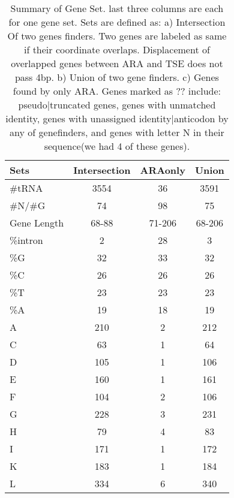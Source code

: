 \documentclass[table,
12pt, %
a4paper, %
oneside, %
headinclude,footinclude, %
BCOR5mm, %
]{scrartcl}
\begin{document}
\begin{table}[htbp]
  \caption{Summary of Gene Set. last three columns are each for one gene set. Sets are defined as: a) Intersection Of two genes finders. Two genes are labeled as same if their coordinate overlaps. Displacement of overlapped genes between ARA and TSE does not pass 4bp. b) Union of two gene finders. c) Genes found by only ARA. Genes marked as ?? include: pseudo|truncated genes, genes with unmatched identity, genes with unassigned identity|anticodon by any of genefinders, and genes with letter N in their sequence(we had 4 of these genes).}
  \begin{adjustbox}{center}
    \begin{tabular}{|lccc|}
      \hline
      \rowcolor{shadecolor}
      Sets        & Intersection & ARAonly & Union  \\
      \hline\hline
      \#tRNA      & 3554         & 36      & 3591   \\
      \#N/\#G     & 74           & 98      & 75     \\
      Gene Length & 68-88        & 71-206  & 68-206 \\
      \%intron    & 2            & 28      & 3      \\
      \%G         & 32           & 33      & 32     \\
      \%C         & 26           & 26      & 26     \\
      \%T         & 23           & 23      & 23     \\
      \%A         & 19           & 18      & 19     \\
      A           & 210          & 2       & 212    \\
      C           & 63           & 1       & 64     \\
      D           & 105          & 1       & 106    \\
      E           & 160          & 1       & 161    \\
      F           & 104          & 2       & 106    \\
      G           & 228          & 3       & 231    \\
      H           & 79           & 4       & 83     \\
      I           & 171          & 1       & 172    \\
      K           & 183          & 1       & 184    \\
      L           & 334          & 6       & 340    \\

\end{tabular}
\end{adjustbox}
\end{table}
\end{document}

